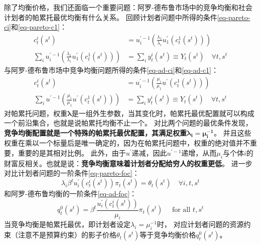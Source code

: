 除了均衡价格，我们还面临一个重要问题：阿罗-德布鲁市场中的竞争均衡和社会计划者的帕累托最优均衡有什么关系。
回顾计划者问题中所得的条件\ref{eq-pareto-ci}和\ref{eq-pareto-c1}：
\begin{equation*}
    \begin{aligned}
        c_t^i\left(s^t\right)&=u_i^{\prime-1}\left(\frac{\lambda_1}{\lambda_i} u_1^{\prime}\left(c_t^1\left(s^t\right)\right)\right) \\
        \sum_i u_i^{\prime-1}\left(\frac{\lambda_1}{\lambda_i} u_1^{\prime}\left(c_t^1\left(s^t\right)\right)\right)
            &=\sum_i y_t^i\left(s^t\right) \equiv Y_t\left(s^t\right) \quad \forall t, s^t
    \end{aligned}
\end{equation*}
与阿罗-德布鲁市场中竞争均衡问题所得的条件\ref{eq-ad-ci}和\ref{eq-ad-c1}：
\begin{equation*}
    \begin{aligned}
        c_t^i\left(s^t\right) &= u_i^{\prime-1}\left(\frac{\mu_i}{\mu_1} u^{\prime}\left(c_t^1\left(s^t\right)\right)\right) \\
        \sum_i u^{\prime-1}\left(\frac{\mu_i}{\mu_1} u^{\prime}\left(c_t^1\left(s^t\right)\right)\right)
            &=\sum_i y_t^i\left(s^t\right)\equiv Y_t\left(s^t\right) \quad \forall t, s^t
    \end{aligned}
\end{equation*}
对帕累托问题，权重$\boldsymbol{\lambda}$是一组外生参数，当其变化时，帕累托最优配置就可以构成一个前沿集合，也就是说帕累托均衡不止一个。
对比两个问题的最优条件发现，\textbf{竞争均衡配置就是一个特殊的帕累托最优配置，其满足权重}$\boldsymbol{\lambda_i = \mu_i^{-1}}$。
并且这些权重在乘以一个标量后是唯一确定的，因为在帕累托问题中，权重的绝对值并不重要，重要的是其相对比例。
此外，由于$u^{\prime}$递减，因此$u^{\prime-1}$递增，从而$\mu_i$与个体$i$的财富反相关。也就是说：\textbf{竞争均衡意味着计划者分配给穷人的权重更低}。
进一步对比计划者问题的一阶条件\ref{eq-pareto-foc}：
\begin{equation*}
    \lambda_i \beta^t u_i^{\prime}\left(c_t^i\left(s^t\right)\right) \pi_t\left(s^t\right)=\theta_t\left(s^t\right) \quad \forall i, t, s^t
\end{equation*}
和阿罗-德布鲁均衡的一阶条件\ref{eq-ad-foc}：
\begin{equation*} 
    q_t^0\left(s^t\right) = \beta^t \frac{u_i^{\prime}\left(c_t^i\left(s^t\right)\right)}{\mu_i} \pi_t\left(s^t\right)
    \quad \text { for all } t, s^t
\end{equation*}
当竞争均衡是帕累托最优，即计划者设定$\lambda_i = \mu_i^{-1}$时，
对应计划者问题的资源约束（注意不是预算约束）的影子价格$\theta_t\left(s^t\right)$等于竞争均衡价格$q_t^0\left(s^t\right)$。


